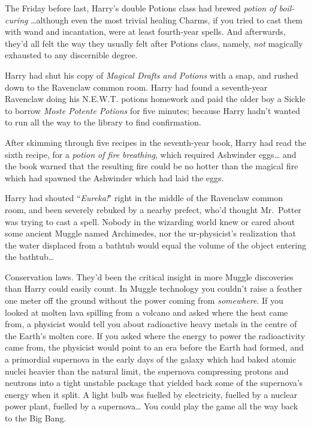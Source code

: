 The Friday before last, Harry's double Potions class had brewed \emph{potion of boil-curing} {\ldots}although even the most trivial healing Charms, if you tried to cast them with wand and incantation, were at least fourth-year spells. And afterwards, they'd all felt the way they usually felt after Potions class, namely, \emph{not} magically exhausted to any discernible degree.

Harry had shut his copy of \emph{Magical Drafts and Potions} with a snap, and rushed down to the Ravenclaw common room. Harry had found a seventh-year Ravenclaw doing his N.E.W.T. potions homework and paid the older boy a Sickle to borrow \emph{Moste Potente Potions} for five minutes; because Harry hadn't wanted to run all the way to the library to find confirmation.

After skimming through five recipes in the seventh-year book, Harry had read the sixth recipe, for a \emph{potion of fire breathing}, which required Ashwinder eggs{\ldots} and the book warned that the resulting fire could be no hotter than the magical fire which had spawned the Ashwinder which had laid the eggs.

Harry had shouted ``\emph{Eureka!}" right in the middle of the Ravenclaw common room, and been severely rebuked by a nearby prefect, who'd thought Mr.~Potter was trying to cast a spell. Nobody in the wizarding world knew or cared about some ancient Muggle named Archimedes, nor the ur-physicist's realization that the water displaced from a bathtub would equal the volume of the object entering the bathtub{\ldots}

Conservation laws. They'd been the critical insight in more Muggle discoveries than Harry could easily count. In Muggle technology you couldn't raise a feather one meter off the ground without the power coming from \emph{somewhere}. If you looked at molten lava spilling from a volcano and asked where the heat came from, a physicist would tell you about radioactive heavy metals in the centre of the Earth's molten core. If you asked where the energy to power the radioactivity came from, the physicist would point to an era before the Earth had formed, and a primordial supernova in the early days of the galaxy which had baked atomic nuclei heavier than the natural limit, the supernova compressing protons and neutrons into a tight unstable package that yielded back some of the supernova's energy when it split. A light bulb was fuelled by electricity, fuelled by a nuclear power plant, fuelled by a supernova{\ldots} You could play the game all the way back to the Big Bang.

